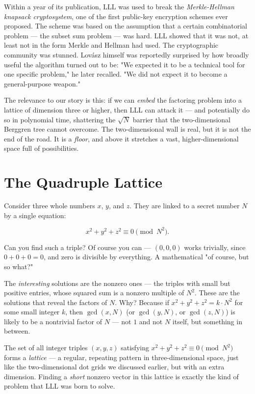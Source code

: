 Within a year of its publication, LLL was used to break the \textit{Merkle-Hellman knapsack cryptosystem}, one of the first public-key encryption schemes ever proposed. The scheme was based on the assumption that a certain combinatorial problem --- the subset sum problem --- was hard. LLL showed that it was not, at least not in the form Merkle and Hellman had used. The cryptographic community was stunned. Lovász himself was reportedly surprised by how broadly useful the algorithm turned out to be: "We expected it to be a technical tool for one specific problem," he later recalled. "We did not expect it to become a general-purpose weapon."

The relevance to our story is this: if we can \textit{embed} the factoring problem into a lattice of dimension three or higher, then LLL can attack it --- and potentially do so in polynomial time, shattering the $\sqrt{N}$ barrier that the two-dimensional Berggren tree cannot overcome. The two-dimensional wall is real, but it is not the end of the road. It is a \textit{floor}, and above it stretches a vast, higher-dimensional space full of possibilities.


\ornbreak



\section{The Quadruple Lattice}


Consider three whole numbers $x$, $y$, and $z$. They are linked to a secret number $N$ by a single equation:

\[
x^2 + y^2 + z^2 \equiv 0 \pmod{N^2}.
\]

Can you find such a triple? Of course you can --- $(0, 0, 0)$ works trivially, since $0 + 0 + 0 = 0$, and zero is divisible by everything. A mathematical "of course, but so what?"

The \textit{interesting} solutions are the nonzero ones --- the triples with small but positive entries, whose squared sum is a nonzero multiple of $N^2$. These are the solutions that reveal the factors of $N$. Why? Because if $x^2 + y^2 + z^2 = k \cdot N^2$ for some small integer $k$, then $\gcd(x, N)$ (or $\gcd(y, N)$, or $\gcd(z, N)$) is likely to be a nontrivial factor of $N$ --- not $1$ and not $N$ itself, but something in between.

The set of all integer triples $(x, y, z)$ satisfying $x^2 + y^2 + z^2 \equiv 0 \pmod{N^2}$ forms a \textit{lattice} --- a regular, repeating pattern in three-dimensional space, just like the two-dimensional dot grids we discussed earlier, but with an extra dimension. Finding a \textit{short} nonzero vector in this lattice is exactly the kind of problem that LLL was born to solve.


